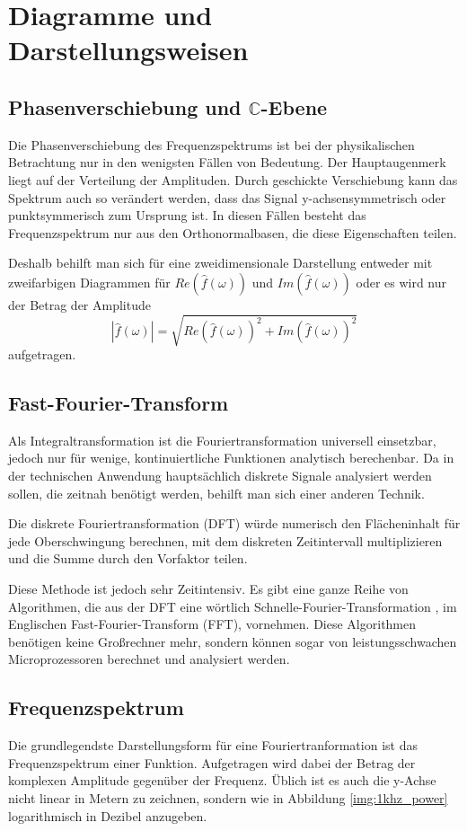 \section{Diagramme und Darstellungsweisen}
\subsection{Phasenverschiebung und $\mathbb{C}$-Ebene}
Die Phasenverschiebung des Frequenzspektrums ist bei der physikalischen Betrachtung nur in den wenigsten Fällen von Bedeutung. Der Hauptaugenmerk liegt auf der Verteilung der Amplituden.
Durch geschickte Verschiebung kann das Spektrum auch so verändert werden, dass das Signal y-achsensymmetrisch oder punktsymmerisch zum Ursprung ist. In diesen Fällen besteht das Frequenzspektrum nur aus den Orthonormalbasen, die diese Eigenschaften teilen.

Deshalb behilft man sich für eine zweidimensionale Darstellung entweder mit zweifarbigen Diagrammen für $Re(\hat{f}(\omega))$ und $Im(\hat{f}(\omega))$ oder es wird nur der Betrag der Amplitude $$ | \hat{f}(\omega) | = \sqrt{ Re(\hat{f}(\omega))^2 + Im(\hat{f}(\omega))^2 } $$ aufgetragen.

\subsection{Fast-Fourier-Transform}
Als Integraltransformation ist die Fouriertransformation universell einsetzbar, jedoch nur für wenige, kontinuiertliche Funktionen analytisch berechenbar. Da in der technischen Anwendung hauptsächlich diskrete Signale analysiert werden sollen, die zeitnah benötigt werden, behilft man sich einer anderen Technik.

Die diskrete Fouriertransformation (DFT) würde numerisch den Flächeninhalt für jede Oberschwingung berechnen, mit dem diskreten Zeitintervall multiplizieren und die Summe durch den Vorfaktor teilen.

Diese Methode ist jedoch sehr Zeitintensiv. Es gibt eine ganze Reihe von Algorithmen, die aus der DFT eine wörtlich \glqq Schnelle-Fourier-Transformation \grqq, im Englischen Fast-Fourier-Transform (FFT), vornehmen. Diese Algorithmen benötigen keine Gro\ss rechner mehr, sondern können sogar von leistungsschwachen Microprozessoren berechnet und analysiert werden. \cite{web:lang12}

\subsection{Frequenzspektrum}
Die grundlegendste Darstellungsform für eine Fouriertranformation ist das Frequenzspektrum einer Funktion. Aufgetragen wird dabei der Betrag der komplexen Amplitude gegenüber der Frequenz. Üblich ist es auch die y-Achse nicht linear in Metern zu zeichnen, sondern wie in Abbildung \ref{img:1khz_power} logarithmisch in Dezibel anzugeben.

